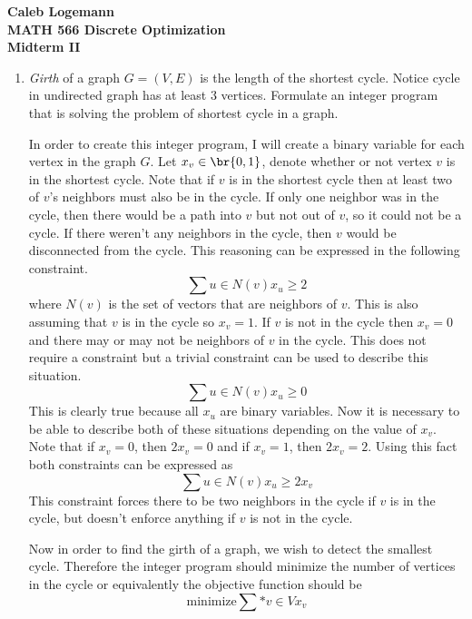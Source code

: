 \documentclass[11pt, oneside]{article}
\begin{document}
\noindent \textbf{\Large{Caleb Logemann \\
MATH 566 Discrete Optimization\\
Midterm II
}}

%
\begin{enumerate}
  \item %
    \emph{Girth} of a graph $G=(V,E)$ is the length of the shortest cycle. 
    Notice cycle in undirected graph has at least 3 vertices.
    Formulate an  integer program that is solving the problem of shortest cycle
    in a graph.

    In order to create this integer program, I will create a binary variable for
    each vertex in the graph $G$.
    Let $x_v \in \br{0, 1}$, denote whether or not vertex $v$ is in the
    shortest cycle.
    Note that if $v$ is in the shortest cycle then at least two of $v$'s
    neighbors must also be in the cycle.
    If only one neighbor was in the cycle, then there would be a path into
    $v$ but not out of $v$, so it could not be a cycle.
    If there weren't any neighbors in the cycle, then $v$ would be disconnected
    from the cycle.
    This reasoning can be expressed in the following constraint.
    \[
      \sum{u \in N(v)}{}{x_u} \ge 2
    \]
    where $N(v)$ is the set of vectors that are neighbors of $v$.
    This is also assuming that $v$ is in the cycle so $x_v = 1$.
    If $v$ is not in the cycle then $x_v = 0$ and there may or may not
    be neighbors of $v$ in the cycle.
    This does not require a constraint but a trivial constraint can be used
    to describe this situation.
    \[
      \sum{u \in N(v)}{}{x_u} \ge 0
    \]
    This is clearly true because all $x_u$ are binary variables.
    Now it is necessary to be able to describe both of these situations
    depending on the value of $x_v$.
    Note that if $x_v = 0$, then $2x_v = 0$ and if $x_v = 1$, then $2x_v = 2$.
    Using this fact both constraints can be expressed as
    \[
      \sum{u \in N(v)}{}{x_u} \ge 2x_v
    \]
    This constraint forces there to be two neighbors in the cycle if $v$ is in
    the cycle, but doesn't enforce anything if $v$ is not in the cycle.

    Now in order to find the girth of a graph, we wish to detect the smallest
    cycle.
    Therefore the integer program should minimize the number of vertices in the
    cycle or equivalently the objective function should be
    \[
      \text{minimize} \sum*{v \in V}{}{x_v}
    \]


\end{enumerate}
\end{document}
